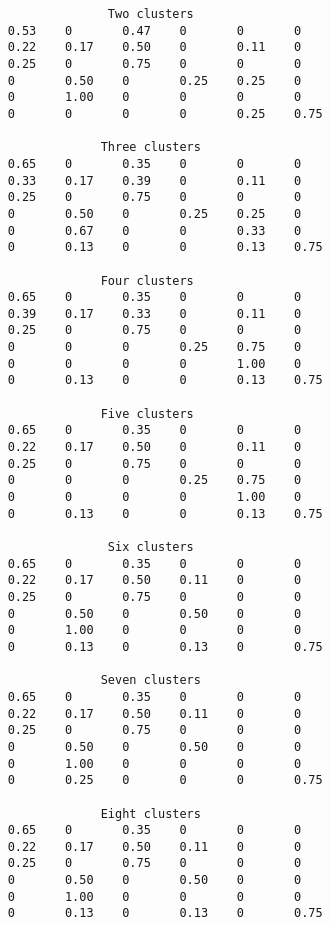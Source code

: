 \documentclass[a4paper]{article}
\begin{document}
\begin{verbatim}
                  Two clusters
    0.53    0       0.47    0       0       0   
    0.22    0.17    0.50    0       0.11    0   
    0.25    0       0.75    0       0       0   
    0       0.50    0       0.25    0.25    0   
    0       1.00    0       0       0       0   
    0       0       0       0       0.25    0.75

                 Three clusters
    0.65    0       0.35    0       0       0   
    0.33    0.17    0.39    0       0.11    0   
    0.25    0       0.75    0       0       0   
    0       0.50    0       0.25    0.25    0   
    0       0.67    0       0       0.33    0   
    0       0.13    0       0       0.13    0.75

                 Four clusters
    0.65    0       0.35    0       0       0   
    0.39    0.17    0.33    0       0.11    0   
    0.25    0       0.75    0       0       0   
    0       0       0       0.25    0.75    0   
    0       0       0       0       1.00    0   
    0       0.13    0       0       0.13    0.75

                 Five clusters
    0.65    0       0.35    0       0       0   
    0.22    0.17    0.50    0       0.11    0   
    0.25    0       0.75    0       0       0   
    0       0       0       0.25    0.75    0   
    0       0       0       0       1.00    0   
    0       0.13    0       0       0.13    0.75
 
                  Six clusters
    0.65    0       0.35    0       0       0   
    0.22    0.17    0.50    0.11    0       0   
    0.25    0       0.75    0       0       0   
    0       0.50    0       0.50    0       0   
    0       1.00    0       0       0       0   
    0       0.13    0       0.13    0       0.75

                 Seven clusters
    0.65    0       0.35    0       0       0   
    0.22    0.17    0.50    0.11    0       0   
    0.25    0       0.75    0       0       0   
    0       0.50    0       0.50    0       0   
    0       1.00    0       0       0       0   
    0       0.25    0       0       0       0.75

                 Eight clusters
    0.65    0       0.35    0       0       0   
    0.22    0.17    0.50    0.11    0       0   
    0.25    0       0.75    0       0       0   
    0       0.50    0       0.50    0       0   
    0       1.00    0       0       0       0   
    0       0.13    0       0.13    0       0.75


\end{verbatim}
\end{document}
